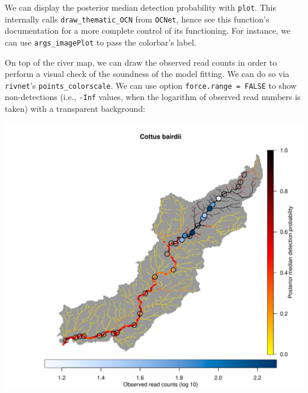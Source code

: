 \documentclass[
]{article}
\newenvironment{Shaded}{\begin{snugshade}}{\end{snugshade}}
\newcommand{\AttributeTok}[1]{\textcolor[rgb]{0.13,0.29,0.53}{#1}}
\newcommand{\ConstantTok}[1]{\textcolor[rgb]{0.56,0.35,0.01}{#1}}
\newcommand{\DecValTok}[1]{\textcolor[rgb]{0.00,0.00,0.81}{#1}}
\newcommand{\FunctionTok}[1]{\textcolor[rgb]{0.13,0.29,0.53}{\textbf{#1}}}
\newcommand{\NormalTok}[1]{#1}
\newcommand{\SpecialCharTok}[1]{\textcolor[rgb]{0.81,0.36,0.00}{\textbf{#1}}}
\newcommand{\StringTok}[1]{\textcolor[rgb]{0.31,0.60,0.02}{#1}}
\begin{document}
We can display the posterior median detection probability with \texttt{plot}. This internally calls \texttt{draw\_thematic\_OCN} from \texttt{OCNet}, hence see this function's documentation for a more complete control of its functioning. For instance, we can use \texttt{args\_imagePlot} to pass the colorbar's label.

On top of the river map, we can draw the observed read counts in order to perform a visual check of the soundness of the model fitting. We can do so via \texttt{rivnet}'s \texttt{points\_colorscale}. We can use option \texttt{force.range\ =\ FALSE} to show non-detections (i.e., \texttt{-Inf} values, when the logarithm of observed read numbers is taken) with a transparent background:

\begin{Shaded}
\end{Shaded}

\includegraphics{Illustrating_eDITH_files/figure-latex/unnamed-chunk-23-1.pdf}
\end{document}
